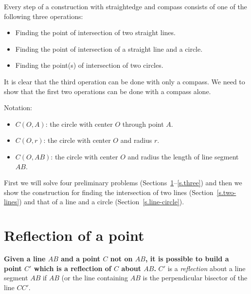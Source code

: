 Every step of a construction with straightedge and compass consists of one of the following three operations:
\begin{itemize}
\item Finding the point of intersection of two straight lines.
\item Finding the point of intersection of a straight line and a circle.
\item Finding the point(s) of intersection of two circles.
\end{itemize}
It is clear that the third operation can be done with only a compass. We need to show that the first two operations can be done with a compass alone.

Notation:
\begin{itemize}
\item $C(O,A)$: the circle with center $O$ through point $A$.
\item $C(O,r)$: the circle with center $O$ and radius $r$.
\item $C(O,AB)$: the circle with center $O$ and radius the length of line segment $AB$.
\end{itemize}

First we will solve four preliminary problems (Sections~\ref{s.reflection}--\ref{s.three}) and then we show the construction for finding the intersection of two lines (Section~\ref{s.two-lines}) and that of a line and a circle (Section~\ref{s.line-circle}).


\section{Reflection of a point}\label{s.reflection}

\textbf{Given a line $AB$ and a point $C$ not on $AB$, it is possible to build a point $C'$ which is a reflection of $C$ about $AB$.} $C'$ is a \emph{reflection} about a line segment $AB$ if $AB$ (or the line containing $AB$ is the perpendicular bisector of the line $CC'$.

